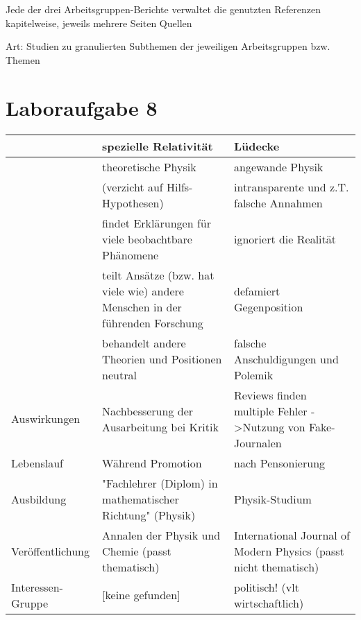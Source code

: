 \documentclass{article}
\begin{document}
Jede der drei Arbeitsgruppen-Berichte verwaltet die genutzten Referenzen kapitelweise, jeweils mehrere Seiten Quellen

Art: Studien zu granulierten Subthemen der jeweiligen Arbeitsgruppen bzw. Themen

\pagebreak
\section{Laboraufgabe 8}

\renewcommand*{\arraystretch}{1.5}
\begin{longtable}{@{}|p{}|p{}p{}|@{}}
    \hline
                      & spezielle Relativität                                                         & Lüdecke                                                          \\ \hline
    \endfirsthead
    \endhead
    \hline
    \endfoot
    \endlastfoot
                      & theoretische Physik                                                           & angewande Physik                                                 \\
                      & (verzicht auf Hilfs-Hypothesen)                                               & intransparente und z.T. falsche Annahmen                         \\
                      & findet Erklärungen für viele beobachtbare Phänomene                           & ignoriert die Realität                                           \\
                      & teilt Ansätze (bzw. hat viele wie) andere Menschen in der führenden Forschung & defamiert Gegenposition                                          \\
                      & behandelt andere Theorien und Positionen neutral                              & falsche Anschuldigungen und Polemik                              \\
    Auswirkungen      & Nachbesserung der Ausarbeitung bei Kritik                                     & Reviews finden multiple Fehler -\textgreater Nutzung von Fake-Journalen      \\
    Lebenslauf        & Während Promotion                                                             & nach Pensonierung                                                \\
    Ausbildung        & "Fachlehrer (Diplom) in mathematischer Richtung" (Physik)                     & Physik-Studium                                                   \\
    Veröffentlichung  & Annalen der Physik und Chemie (passt thematisch)                              & International Journal of Modern Physics (passt nicht thematisch) \\
    Interessen-Gruppe & {[}keine gefunden{]}                                                          & politisch! (vlt wirtschaftlich)                                  \\ \hline
    \end{longtable}
\end{document}
